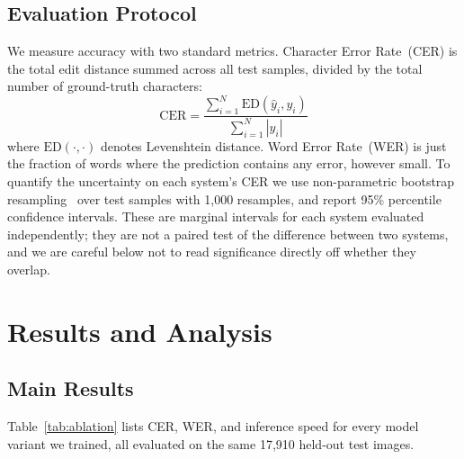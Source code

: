 \documentclass[conference]{IEEEtran}
\begin{document}
\subsection{Evaluation Protocol}

We measure accuracy with two standard metrics. Character Error Rate~(CER) is the total edit distance summed across all test samples, divided by the total number of ground-truth characters:
\begin{equation}
    \text{CER} = \frac{\sum_{i=1}^{N} \text{ED}(\hat{y}_i, y_i)}{\sum_{i=1}^{N} |y_i|}
\end{equation}
where $\text{ED}(\cdot, \cdot)$ denotes Levenshtein distance. Word Error Rate~(WER) is just the fraction of words where the prediction contains any error, however small. To quantify the uncertainty on each system's CER we use non-parametric bootstrap resampling~\cite{efron1993bootstrap} over test samples with 1,000 resamples, and report 95\% percentile confidence intervals. These are marginal intervals for each system evaluated independently; they are not a paired test of the difference between two systems, and we are careful below not to read significance directly off whether they overlap.

\section{Results and Analysis}
\label{sec:results}

\subsection{Main Results}

Table~\ref{tab:ablation} lists CER, WER, and inference speed for every model variant we trained, all evaluated on the same 17,910 held-out test images.
\end{document}
